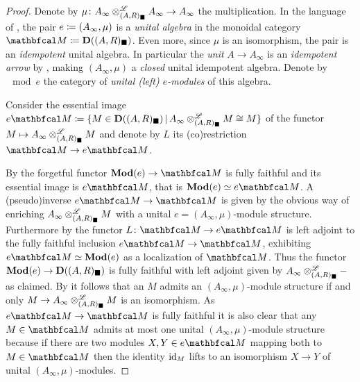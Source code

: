 \begin{proof}
	Denote by $\mu\colon A_\infty\otimes^{\mathscr{L}}_{(A, R)_\blacksquare} A_\infty\to A_\infty$ the multiplication. In the language of \cite[Section 2]{boyarchenko-drinfeld2009idempotents}, the pair $e\coloneqq (A_\infty, \mu)$ is a \emph{unital algebra} in the monoidal category $\category{M}\ldef \derived{(A, R)_\blacksquare}$. Even more, since $\mu$ is an isomorphism, the pair is an \emph{idempotent} unital algebra. In particular the \emph{unit} $A\to A_\infty$ is an \emph{idempotent arrow} by \cite[Remark 2.9 (vi)]{boyarchenko-drinfeld2009idempotents}, making $(A_\infty, \mu)$ a \emph{closed} unital idempotent algebra. Denote by $\mod{e}$ the category of \emph{unital (left) $e$-modules} of this algebra.
	
	
	
	Consider the essential image $e\category{M}\ldef \{M \in \derived{(A, R)_\blacksquare}\setseparator A_\infty\Dotimes_{(A, R)_\blacksquare} M \cong M\}$ of the functor $M \mapsto A_\infty\otimes^{\mathscr{L}}_{(A, R)_\blacksquare} M$ and denote by $L$ its (co)restriction $\category{M}\to e\category{M}$.
	
	By \cite[Lemma 2.32 (ii)]{boyarchenko-drinfeld2009idempotents} the forgetful functor $\mod{e} \to \category{M}$ is fully faithful and its essential image is $e\category{M}$, that is $\mod{e}\equiv e\category{M}$. A (pseudo)inverse $e\category{M} \to \category{M}$ is given by the obvious way of enriching $A_\infty\otimes^{\mathscr{L}}_{(A, R)_\blacksquare} M$ with a unital $e=(A_\infty, \mu)$-module structure. Furthermore by \cite[Prop. 2.22 (a)]{boyarchenko-drinfeld2009idempotents} the functor $L\colon \category{M}\to e\category{M}$ is left adjoint to the fully faithful inclusion $e\category{M} \to \category{M}$, exhibiting $e\category{M}\equiv \mod{e}$ as a localization of $\category{M}$. Thus the functor ${{\mathbf{Mod}}(e)} \to {{\mathbf{D}}((A, R)_\blacksquare)}$ is fully faithful with left adjoint given by $A_\infty\otimes^{\mathscr{L}}_{(A, R)_\blacksquare} -$ as claimed. By \cite[Lemma 2.15]{boyarchenko-drinfeld2009idempotents} it follows that an $M$ admits an $(A_\infty, \mu)$-module structure if and only $M \to A_\infty\otimes^{\mathscr{L}}_{(A, R)_\blacksquare} M$ is an isomorphism. As $e\category{M}\to \category{M}$ is fully faithful it is also clear that any $M\in\category{M}$ admits at most one unital $(A_\infty, \mu)$-module structure because if there are two modules $X, Y \in e\category{M}$ mapping both to $M \in \category{M}$ then the identity $\mathrm{id}_M$ lifts to an isomorphism $X \to Y$ of unital $(A_\infty, \mu)$-modules.
		

\end{proof}

